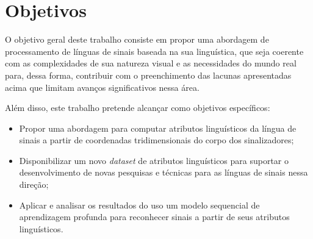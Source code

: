 \section{Objetivos}
\label{sec:objetivos}

O objetivo geral deste trabalho consiste em propor uma abordagem de processamento de línguas de sinais baseada na sua linguística, que seja coerente com as complexidades de sua natureza visual e as necessidades do mundo real para, dessa forma, contribuir com o preenchimento das lacunas apresentadas acima que limitam avanços significativos nessa área.


Além disso, este trabalho pretende alcançar como objetivos específicos:

\begin{itemize}
    \item Propor uma abordagem para computar atributos linguísticos da língua de sinais a partir de coordenadas tridimensionais do corpo dos sinalizadores;
    \item Disponibilizar um novo \textit{dataset} de atributos linguísticos para suportar o desenvolvimento de novas pesquisas e técnicas para as línguas de sinais nessa direção;
    \item Aplicar e analisar os resultados do uso um modelo sequencial de aprendizagem profunda para reconhecer sinais a partir de seus atributos linguísticos.
\end{itemize}


    

